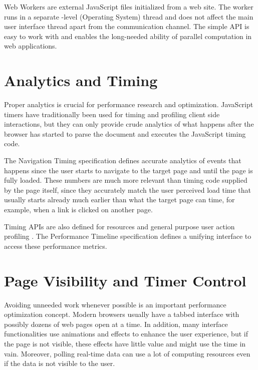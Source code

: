 Web Workers are external JavaScript files initialized from a web
site. The worker runs in a separate -level (Operating System)
thread and does not affect the main user interface thread apart from
the communication channel. The simple API is easy to work with and
enables the long-needed ability of parallel computation in web
applications.

\section{Analytics and Timing}

Proper analytics is crucial for performance research and
optimization. JavaScript timers have traditionally been used for
timing and profiling client side interactions, but they can only
provide crude analytics of what happens after the browser has started
to parse the document and executes the JavaScript timing code.

The Navigation Timing specification \cite{NavigationTiming} defines
accurate analytics of events that happens since the user starts to
navigate to the target page and until the page is fully loaded. These
numbers are much more relevant than timing code supplied by the page
itself, since they accurately match the user perceived load time that
usually starts already much earlier than what the target page can
time, for example, when a link is clicked on another page.

Timing APIs are also defined for resources \cite{ResourceTiming} and
general purpose user action profiling \cite{UserTiming}. The
Performance Timeline specification \cite{PerformanceTimeline} defines
a unifying interface to access these performance metrics.

\section{Page Visibility and Timer Control}

Avoiding unneeded work whenever possible is an important performance
optimization concept. Modern browsers usually have a tabbed interface
with possibly dozens of web pages open at a time. In addition, many
interface functionalities use animations and effects to enhance the
user experience, but if the page is not visible, these effects have
little value and might use the  time in vain. Moreover,
polling real-time data can use a lot of computing resources even if
the data is not visible to the user.

